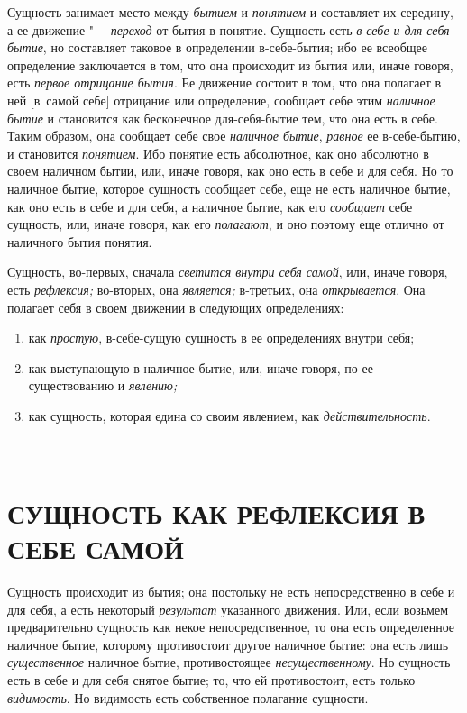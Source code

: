 Сущность занимает место между {\em бытием} и
{\em понятием} и составляет их середину, а ее движение
"--- {\em переход} от бытия в понятие. Сущность есть
{\em в-себе-и-для-себя-бытие}, но составляет таковое в
определении в-себе-бытия; ибо ее всеобщее определение заключается в том,
что она происходит из бытия или, иначе говоря, есть
{\em первое отрицание бытия}. Ее движение состоит в
том, что она полагает в ней [в~самой себе] отрицание или определение,
сообщает себе этим {\em наличное бытие} и становится
как бесконечное для-себя-бытие тем, что она есть в себе. Таким образом, она
сообщает себе свое {\em наличное бытие},
{\em равное} ее в-себе-бытию, и становится
{\em понятием}. Ибо понятие есть абсолютное, как оно
абсолютно в своем наличном бытии, или, иначе говоря, как оно есть в себе и
для себя. Но то наличное бытие, которое сущность сообщает себе, еще не есть
наличное бытие, как оно есть в себе и для себя, а наличное бытие, как его
{\em сообщает} себе сущность, или, иначе говоря, как
его {\em полагают}, и оно поэтому еще отлично от
наличного бытия понятия.

Сущность, во-первых, сначала {\em светится внутри себя
самой}, или, иначе говоря, есть {\em рефлексия;}
во-вторых, она {\em является;} в-третьих, она
{\em открывается}. Она полагает себя в своем движении в
следующих определениях:
\begin{enumerate}[~~~~I.]
\item как {\em простую}, в-себе-сущую сущность в ее определениях внутри себя;
\item как выступающую в наличное бытие, или, иначе
  говоря, по ее существованию и {\em явлению;}
\item как сущность, которая едина со своим
  явлением, как {\em действительность}.
\end{enumerate}

\clearpage


\part[\small СУЩНОСТЬ КАК РЕФЛЕКСИЯ В СЕБЕ САМОЙ]%
     {\fontsize{9}{11}\selectfont{\mdseries ПЕРВЫЙ ОТДЕЛ}\\%
      \normalsize СУЩНОСТЬ КАК РЕФЛЕКСИЯ В СЕБЕ САМОЙ}

Сущность происходит из бытия; она постольку не
есть непосредственно в себе и для себя, а есть некоторый
{\em результат} указанного движения. Или, если возьмем
предварительно сущность как некое непосредственное, то она есть
определенное наличное бытие, которому противостоит другое наличное бытие:
она есть лишь {\em существенное} наличное бытие,
противостоящее {\em несущественному}. Но сущность есть
в себе и для себя снятое бытие; то, что ей противостоит, есть только
{\em видимость}. Но видимость есть собственное полагание сущности.

